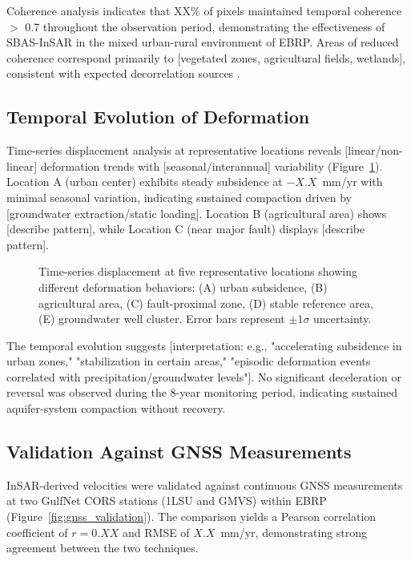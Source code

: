 Coherence analysis indicates that XX\% of pixels maintained temporal coherence $>$ 0.7 throughout the observation period, demonstrating the effectiveness of SBAS-InSAR in the mixed urban-rural environment of EBRP. Areas of reduced coherence correspond primarily to [vegetated zones, agricultural fields, wetlands], consistent with expected decorrelation sources \citep{Berardino2002}.

\subsection{Temporal Evolution of Deformation}

Time-series displacement analysis at representative locations reveals [linear/non-linear] deformation trends with [seasonal/interannual] variability (Figure~\ref{fig:timeseries}). Location A (urban center) exhibits steady subsidence at $-X.X$~mm/yr with minimal seasonal variation, indicating sustained compaction driven by [groundwater extraction/static loading]. Location B (agricultural area) shows [describe pattern], while Location C (near major fault) displays [describe pattern].

\begin{figure}[!t]
\centering
\caption{Time-series displacement at five representative locations showing different deformation behaviors: (A) urban subsidence, (B) agricultural area, (C) fault-proximal zone, (D) stable reference area, (E) groundwater well cluster. Error bars represent $\pm 1\sigma$ uncertainty.}
\label{fig:timeseries}
\end{figure}

The temporal evolution suggests [interpretation: e.g., "accelerating subsidence in urban zones," "stabilization in certain areas," "episodic deformation events correlated with precipitation/groundwater levels"]. No significant deceleration or reversal was observed during the 8-year monitoring period, indicating sustained aquifer-system compaction without recovery.

\subsection{Validation Against GNSS Measurements}

InSAR-derived velocities were validated against continuous GNSS measurements at two GulfNet CORS stations (1LSU and GMVS) within EBRP (Figure~\ref{fig:gnss_validation}). The comparison yields a Pearson correlation coefficient of $r = 0.XX$ and RMSE of $X.X$~mm/yr, demonstrating strong agreement between the two techniques.

